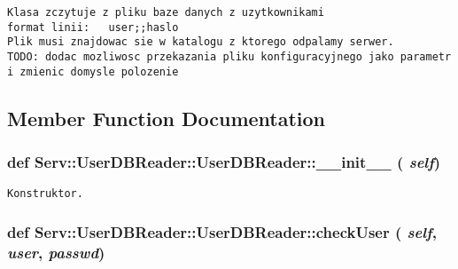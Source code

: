 \footnotesize\begin{verbatim}Klasa zczytuje z pliku baze danych z uzytkownikami
format linii:   user;;haslo
Plik musi znajdowac sie w katalogu z ktorego odpalamy serwer.
TODO: dodac mozliwosc przekazania pliku konfiguracyjnego jako parametr i zmienic domysle polozenie

\end{verbatim}
\normalsize
 

\subsection{Member Function Documentation}
\hypertarget{class_serv_1_1_user_d_b_reader_1_1_user_d_b_reader_f3811b4b6123fe47153f9d87631322a9}{
\subsubsection[{\_\-\_\-init\_\-\_\-}]{\setlength{\rightskip}{0pt plus 5cm}def Serv::UserDBReader::UserDBReader::\_\-\_\-init\_\-\_\- ( {\em self})}}
\label{class_serv_1_1_user_d_b_reader_1_1_user_d_b_reader_f3811b4b6123fe47153f9d87631322a9}




\footnotesize\begin{verbatim}Konstruktor.\end{verbatim}
\normalsize
 \hypertarget{class_serv_1_1_user_d_b_reader_1_1_user_d_b_reader_1fa47b601f3968090cf56b959f50ca94}{
\subsubsection[{checkUser}]{\setlength{\rightskip}{0pt plus 5cm}def Serv::UserDBReader::UserDBReader::checkUser ( {\em self}, \/   {\em user}, \/   {\em passwd})}}
\label{class_serv_1_1_user_d_b_reader_1_1_user_d_b_reader_1fa47b601f3968090cf56b959f50ca94}




